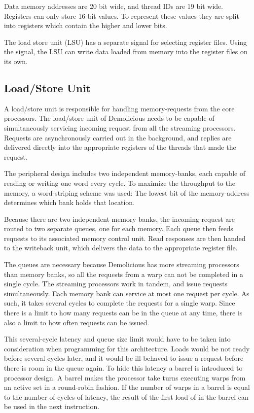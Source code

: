 \documentclass[../main/report.tex]{subfiles}
\begin{document}
Data memory addresses are 20 bit wide, and thread IDs are 19 bit wide.
Registers can only store 16 bit values.	
To represent these values they are split into registers which contain the higher and lower bits.

The load store unit (LSU) has a separate signal for selecting register files.
Using the signal, the LSU can write data loaded from memory into the register files on its own.


\subsection{Load/Store Unit}
A load/store unit is responsible for handling memory-requests from the core processors.
The load/store-unit of Demolicious needs to be capable of simultaneously servicing incoming request from all the streaming processors.
Requests are asynchronously carried out in the background, and replies are delivered directly into the appropriate registers of the threads that made the request.

The peripheral design includes two independent memory-banks, each capable of reading or writing one word every cycle.
To maximize the throughput to the memory, a word-striping scheme was used:
The lowest bit of the memory-address determines which bank holds that location.

Because there are two independent memory banks, the incoming request are routed to two separate queues, one for each memory.
Each queue then feeds requests to its associated memory control unit.
Read responses are then handed to the writeback unit, which delivers the data to the appropriate register file.

The queues are necessary because Demolicious has more streaming processors than memory banks, so all the requests from a warp can not be completed in a single cycle.
The streaming processors work in tandem, and issue requests simultaneously.
Each memory bank can service at most one request per cycle.
As such, it takes several cycles to complete the requests for a single warp.
Since there is a limit to how many requests can be in the queue at any time, there is also a limit to how often requests can be issued.

This several-cycle latency and queue size limit would have to be taken into consideration when programming for this architecture.
Loads would be not ready before several cycles later, and it would be ill-behaved to issue a request before there is room in the queue again.
To hide this latency a barrel is introduced to processor design.
A barrel makes the processor take turns executing warps from an active set in a round-robin fashion.
If the number of warps in a barrel is equal to the number of cycles of latency, the result of the first load of in the barrel can be used in the next instruction.
\end{document}
